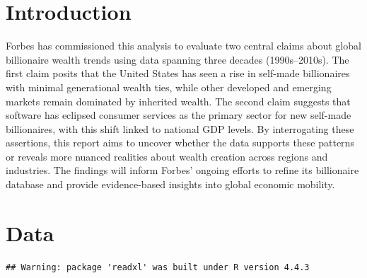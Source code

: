 \documentclass[11pt,preprint]{elsarticle}
\numberwithin{equation}{section}
\numberwithin{figure}{section}
\numberwithin{table}{section}
\begin{document}
\section{\texorpdfstring{Introduction
\label{Introduction}}{Introduction }}\label{introduction}

Forbes has commissioned this analysis to evaluate two central claims
about global billionaire wealth trends using data spanning three decades
(1990s--2010s). The first claim posits that the United States has seen a
rise in self-made billionaires with minimal generational wealth ties,
while other developed and emerging markets remain dominated by inherited
wealth. The second claim suggests that software has eclipsed consumer
services as the primary sector for new self-made billionaires, with this
shift linked to national GDP levels. By interrogating these assertions,
this report aims to uncover whether the data supports these patterns or
reveals more nuanced realities about wealth creation across regions and
industries. The findings will inform Forbes' ongoing efforts to refine
its billionaire database and provide evidence-based insights into global
economic mobility.

\section*{Data}\label{data}

\begin{Shaded}
\begin{Highlighting}[]
\NormalTok{ (}\SpecialCharTok{!}\NormalTok{(}\NormalTok{, } \NormalTok{)) \{}
  \NormalTok{(}\NormalTok{)}
\NormalTok{\}}
\end{Highlighting}
\end{Shaded}

\begin{verbatim}
## Warning: package 'readxl' was built under R version 4.4.3
\end{verbatim}

\begin{Shaded}
\begin{Highlighting}[]
\OtherTok{\textless{}{-}} \NormalTok{(}\NormalTok{)}

\end{Highlighting}
\end{Shaded}
\end{document}
